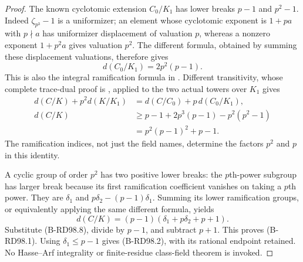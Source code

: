 \begin{proof}
The known cyclotomic extension $C_0/K_1$ has lower breaks
$p-1$ and $p^2-1$. Indeed $\zeta_{p^3}-1$ is a uniformizer;
an element whose cyclotomic exponent is $1+pa$ with $p\nmid a$
has uniformizer displacement of valuation $p$, whereas a nonzero
exponent $1+p^2a$ gives valuation $p^2$.
The different formula, obtained by summing these displacement
valuations, therefore gives
\[
                         d(C_0/K_1)=2p^2(p-1).
                                                        \tag{B-RD98.7}
\]
This is also the integral ramification formula in
\cite[Corollary3.19 and proof, p.~18]{ColmezCorpsLocaux}.
Different transitivity, whose complete trace-dual proof is
\cite[Proposition3.17 and proof, p.~17]{ColmezCorpsLocaux},
applied to the two actual towers over $K_1$ gives
\[
\begin{split}
 d(C/K)+p^2d(K/K_1)
   &=d(C/C_0)+p\,d(C_0/K_1),\\
 d(C/K)&\ge p-1+2p^3(p-1)-p^2(p^2-1)\\
       &=p^2(p-1)^2+p-1.
\end{split}                                             \tag{B-RD98.8}
\]
The ramification indices, not just the field names, determine
the factors $p^2$ and $p$ in this identity.

A cyclic group of order $p^2$ has two positive lower breaks:
the $p$th-power subgroup has larger break because its first
ramification coefficient vanishes on taking a $p$th power.
They are $\delta_1$ and $p\delta_2-(p-1)\delta_1$.
Summing its lower ramification groups, or equivalently applying
the same different formula, yields
\[
              d(C/K)=(p-1)(\delta_1+p\delta_2+p+1).
                                                        \tag{B-RD98.9}
\]
Substitute (B-RD98.8), divide by $p-1$, and subtract $p+1$.
This proves (B-RD98.1). Using $\delta_1\le p-1$ gives
(B-RD98.2), with its rational endpoint retained. No Hasse--Arf
integrality or finite-residue class-field theorem is invoked.
\end{proof}

